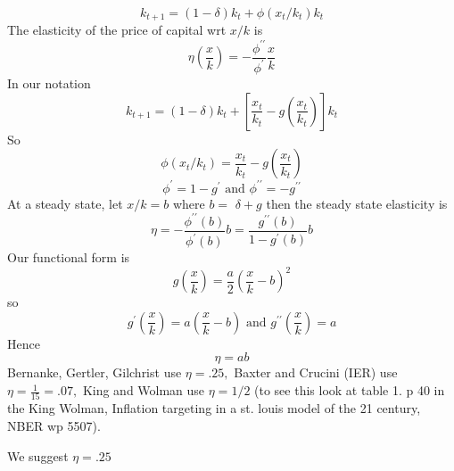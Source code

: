 \documentclass[12pt,leqno,fleqn]{article}
\begin{document}
\[
k_{t+1}=(1-\delta )k_{t}+\phi (x_{t}/k_{t})k_{t}
\]
The elasticity of the price of capital wrt $x/k$ is
\[
\eta (\frac{x}{k})=-\frac{\phi ^{\prime \prime }}{\phi ^{\prime }}\frac{x}{k}
\]
In our notation
\[
k_{t+1}=(1-\delta )k_{t}+\left[ \frac{x_{t}}{k_{t}}-g(\frac{x_{t}}{k_{t}})%
\right] k_{t}
\]
So
\[
\phi (x_{t}/k_{t})=\frac{x_{t}}{k_{t}}-g(\frac{x_{t}}{k_{t}})
\]
\[
\phi ^{\prime }=1-g^{\prime }\text{ and }\phi ^{\prime \prime }=-g^{\prime
\prime }
\]
At a steady state, let $x/k=b$ where $b=$ $\delta +g$ then the steady state
elasticity is  
\[
\eta =-\frac{\phi ^{\prime \prime }(b)}{\phi ^{\prime }(b)}b=\frac{g^{\prime
\prime }(b)}{1-g^{\prime }(b)}b
\]
Our functional form is 
\[
g(\frac{x}{k})=\frac{a}{2}\left( \frac{x}{k}-b\right) ^{2}
\]
so 
\[
g^{\prime }(\frac{x}{k})=a\left( \frac{x}{k}-b\right) \text{ and }g^{\prime
\prime }(\frac{x}{k})=a
\]
Hence
\[
\eta =ab
\]
Bernanke, Gertler, Gilchrist use $\eta =.25,$ Baxter and Crucini (IER) use $%
\eta =\frac{1}{15}=.07,$ King and Wolman use $\eta =1/2$ (to see this look
at table 1. p 40 in the King Wolman, Inflation targeting in a st. louis
model of the 21 century, NBER wp 5507). 

We suggest $\eta =.25$
\end{document}
